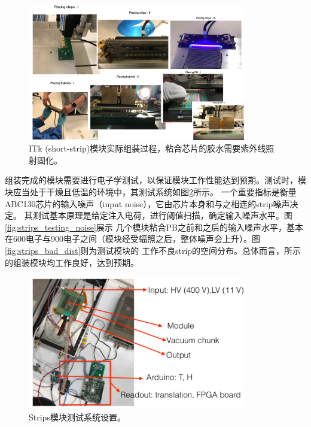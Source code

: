 \begin{figure}[h]
\centering
 \includegraphics[width=0.85\textwidth]{fig/strips_module_assembly.png}
 \caption{ITk (short-strip)模块实际组装过程，粘合芯片的胶水需要紫外线照射固化。}
 \label{fig:strip_moduel_assembly}
\end{figure}
组装完成的模块需要进行电子学测试，以保证模块工作性能达到预期。测试时，模块应当处于干燥且低温的环境中，其测试系统如图\ref{fig:strips_testing_setup}所示。
一个重要指标是衡量ABC130芯片的输入噪声（input noise），它由芯片本身和与之相连的strip噪声决定。
其测试基本原理是给定注入电荷，进行阈值扫描，确定输入噪声水平。图\ref{fig:strips_testing_noise}展示
几个模块粘合PB之前和之后的输入噪声水平，基本在600电子与900电子之间（模块经受辐照之后，整体噪声会上升）。图\ref{fig:strips_bad_dist}则为测试模块的
工作不良strip的空间分布。总体而言，所示的组装模块均工作良好，达到预期。
\begin{figure}[h]
\centering
 \includegraphics[width=0.85\textwidth]{fig/strips_module_setup.png}
 \caption{Strips模块测试系统设置。}
 \label{fig:strips_testing_setup}
\end{figure}

